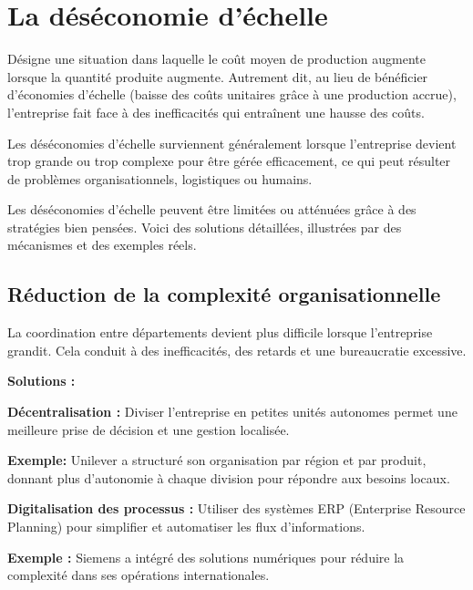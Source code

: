 \chapter*{La déséconomie d'échelle}
\setcounter{chapter}{1}
Désigne une situation dans laquelle le coût moyen de production augmente
lorsque la quantité produite augmente. Autrement dit, au lieu de bénéficier d'économies d'échelle (baisse
des coûts unitaires grâce à une production accrue), l'entreprise fait face à des inefficacités qui entraînent
une hausse des coûts.
\par
Les déséconomies d'échelle surviennent généralement lorsque l'entreprise devient trop grande ou trop
complexe pour être gérée efficacement, ce qui peut résulter de problèmes organisationnels, logistiques
ou humains.
\par
Les déséconomies d'échelle peuvent être limitées ou atténuées grâce à des stratégies bien pensées.
Voici des solutions détaillées, illustrées par des mécanismes et des exemples réels.
\section{Réduction de la complexité organisationnelle}
La coordination entre départements devient plus difficile lorsque l’entreprise grandit. Cela conduit à
des inefficacités, des retards et une bureaucratie excessive.
\par
\textbf{Solutions :} 
\par
\textbf{Décentralisation :} Diviser l’entreprise en petites unités autonomes permet une meilleure prise de
décision et une gestion localisée.
\par
\textbf{Exemple:} Unilever a structuré son organisation par région et par produit, donnant plus
d'autonomie à chaque division pour répondre aux besoins locaux.
\par
\textbf{Digitalisation des processus :} Utiliser des systèmes ERP (Enterprise Resource Planning) pour
simplifier et automatiser les flux d'informations.
\par
\textbf{Exemple :} Siemens a intégré des solutions numériques pour réduire la complexité dans
ses opérations internationales.
